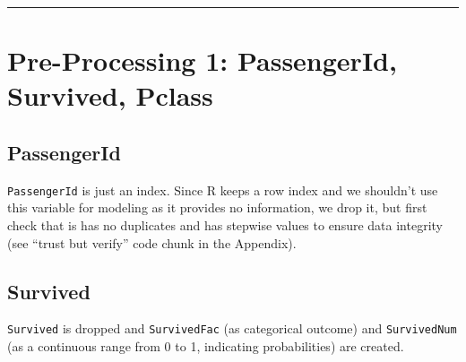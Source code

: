 \documentclass[]{article}
\newenvironment{Shaded}{\begin{snugshade}}{\end{snugshade}}
\newcommand{\KeywordTok}[1]{\textcolor[rgb]{0.13,0.29,0.53}{\textbf{#1}}}
\newcommand{\DataTypeTok}[1]{\textcolor[rgb]{0.13,0.29,0.53}{#1}}
\newcommand{\DecValTok}[1]{\textcolor[rgb]{0.00,0.00,0.81}{#1}}
\newcommand{\StringTok}[1]{\textcolor[rgb]{0.31,0.60,0.02}{#1}}
\newcommand{\CommentTok}[1]{\textcolor[rgb]{0.56,0.35,0.01}{\textit{#1}}}
\newcommand{\OtherTok}[1]{\textcolor[rgb]{0.56,0.35,0.01}{#1}}
\newcommand{\OperatorTok}[1]{\textcolor[rgb]{0.81,0.36,0.00}{\textbf{#1}}}
\newcommand{\NormalTok}[1]{#1}
\begin{document}
\begin{center}\rule{0.5\linewidth}{\linethickness}\end{center}

\section{Pre-Processing 1: PassengerId, Survived,
Pclass}\label{pre-processing-1-passengerid-survived-pclass}

\subsection{PassengerId}\label{passengerid}

\texttt{PassengerId} is just an index. Since R keeps a row index and we
shouldn't use this variable for modeling as it provides no information,
we drop it, but first check that is has no duplicates and has stepwise
values to ensure data integrity (see ``trust but verify'' code chunk in
the Appendix).

\subsection{Survived}\label{survived}

\texttt{Survived} is dropped and \texttt{SurvivedFac} (as categorical
outcome) and \texttt{SurvivedNum} (as a continuous range from 0 to 1,
indicating probabilities) are created.

\begin{Shaded}
\end{Shaded}
\end{document}
